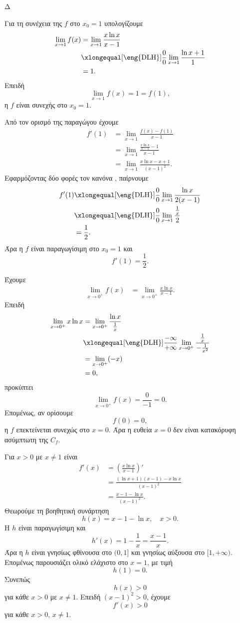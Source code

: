 \begin{thema}{Δ}
\begin{erwthma}
\item Για τη συνέχεια της $f$ στο $x_0=1$ υπολογίζουμε
\begin{align*}
\lim_{x\to1}f(x)
&=\lim_{x\to1}\frac{x\ln x}{x-1}\\
&\xlongequal[\text{\eng{DLH}}]{\frac{0}{0}}
\lim_{x\to1}\frac{\ln x+1}{1}\\
&=1.
\end{align*}
Επειδή
\[
\lim_{x\to1}f(x)=1=f(1),
\]
η $f$ είναι συνεχής στο $x_0=1$.

\item Από τον ορισμό της παραγώγου έχουμε
\begin{align*}
f'(1)
&=\lim_{x\to1}\frac{f(x)-f(1)}{x-1}\\
&=\lim_{x\to1}
\frac{\frac{x\ln x}{x-1}-1}{x-1}\\
&=\lim_{x\to1}
\frac{x\ln x-x+1}{(x-1)^2}.
\end{align*}
Εφαρμόζοντας δύο φορές τον κανόνα , παίρνουμε
\begin{align*}
f'(1)
&\xlongequal[\text{\eng{DLH}}]{\frac{0}{0}}
\lim_{x\to1}\frac{\ln x}{2(x-1)}\\
&\xlongequal[\text{\eng{DLH}}]{\frac{0}{0}}
\lim_{x\to1}\frac{\frac{1}{x}}{2}\\
&=\frac{1}{2}.
\end{align*}
Άρα η $f$ είναι παραγωγίσιμη στο $x_0=1$ και
\[
{f'(1)=\frac{1}{2}}.
\]

\item Έχουμε
\begin{align*}
\lim_{x\to0^+}f(x)
&=\lim_{x\to0^+}\frac{x\ln x}{x-1}.
\end{align*}
Επειδή
\begin{align*}
\lim_{x\to0^+}x\ln x
&=\lim_{x\to0^+}\frac{\ln x}{\frac{1}{x}}\\
&\xlongequal[\text{\eng{DLH}}]{\frac{-\infty}{+\infty}}
\lim_{x\to0^+}\frac{\frac{1}{x}}{-\frac{1}{x^2}}\\
&=\lim_{x\to0^+}(-x)\\
&=0,
\end{align*}
προκύπτει
\[
\lim_{x\to0^+}f(x)=\frac{0}{-1}=0.
\]
Επομένως, αν ορίσουμε
\[
f(0)=0,
\]
η $f$ επεκτείνεται συνεχώς στο $x=0$. Άρα η ευθεία $x=0$ δεν είναι κατακόρυφη ασύμπτωτη της $C_f$.

\item Για $x>0$ με $x\neq1$ είναι
\begin{align*}
f'(x)
&=\left(\frac{x\ln x}{x-1}\right)'\\
&=\frac{(\ln x+1)(x-1)-x\ln x}{(x-1)^2}\\
&=\frac{x-1-\ln x}{(x-1)^2}.
\end{align*}
Θεωρούμε τη βοηθητική συνάρτηση
\[
h(x)=x-1-\ln x,\quad x>0.
\]
Η $h$ είναι παραγωγίσιμη και
\[
h'(x)=1-\frac{1}{x}=\frac{x-1}{x}.
\]
Άρα η $h$ είναι γνησίως φθίνουσα στο $(0,1]$ και γνησίως αύξουσα στο $[1,+\infty)$. Επομένως παρουσιάζει ολικό ελάχιστο στο $x=1$, με τιμή
\[
h(1)=0.
\]
Συνεπώς
\[
h(x)>0
\]
για κάθε $x>0$ με $x\neq1$. Επειδή $(x-1)^2>0$, έχουμε
\[
f'(x)>0
\]
για κάθε $x>0$, $x\neq1$.


\end{erwthma}
\end{thema}
